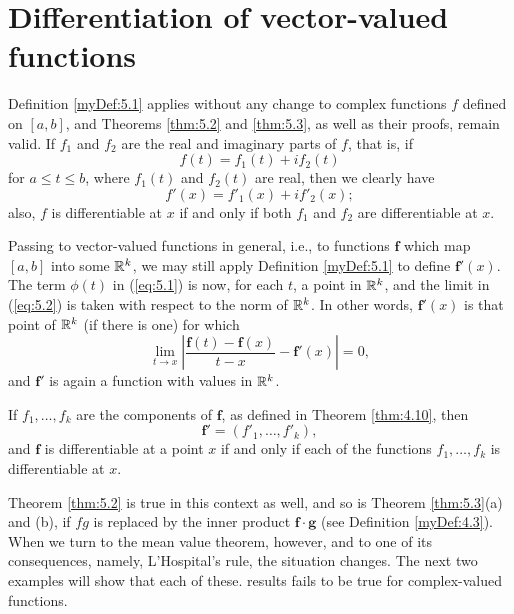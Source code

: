\section{Differentiation of vector-valued functions}

\begin{myRemark}
    Definition \ref{myDef:5.1} applies without any change to complex functions $f$ defined on $[a, b]$, 
    and Theorems \ref{thm:5.2} and \ref{thm:5.3}, as well as their proofs, remain valid. 
    If  $f_1$ and $f_2$ are the real and imaginary parts of $f$, 
    that is, if
    \begin{equation*}
        f(t) = f_1(t) + i f_2(t)
    \end{equation*}
    for $a \leq t \leq b$, where $f_1(t)$ and $f_2(t)$ are real, 
    then we clearly have
    \begin{equation}
        \label{eq:5.29}
        f'(x) = f'_1(x) + i f'_2(x);
    \end{equation}
    also, $f$ is differentiable at $x$ if and only if both $f_1$ and $f_2$ are differentiable at $x$.
\end{myRemark}

Passing to vector-valued functions in general, 
i.e., to functions $\mathbf{f}$ which map $[a, b]$ into some ${\protect\mathbb R}^k$, 
we may still apply Definition \ref{myDef:5.1} to define $\mathbf{f}'(x)$. 
The term $\phi(t)$ in (\ref{eq:5.1}) is now, for each $t$, a point in ${\protect\mathbb R}^k$, 
and the limit in (\ref{eq:5.2}) is taken with respect to the norm of ${\protect\mathbb R}^k$. 
In other words, $\mathbf{f}'(x)$ is that point of ${\protect\mathbb R}^k$ 
(if there is one) for which
\begin{equation}
    \label{eq:5.30}
    \lim_{t \to x} \left| \frac{\mathbf{f}(t) - \mathbf{f}(x)}{t-x} - \mathbf{f}'(x)\right|  = 0,
\end{equation}
and $\mathbf{f}'$ is again a function with values in ${\protect\mathbb R}^k$.

If $f_1, \dots, f_k$ are the components of $\mathbf{f}$, 
as defined in Theorem \ref{thm:4.10}, then
\begin{equation}
    \label{eq:5.31}
    \mathbf{f}' = (f'_1,\dots,f'_k),
\end{equation}
and $\mathbf{f}$ is differentiable at a point $x$ 
if and only if each of the functions $f_1, \dots, f_k$
is differentiable at $x$.

Theorem \ref{thm:5.2} is true in this context as well, 
and so is Theorem \ref{thm:5.3}(a) and (b), 
if $fg$ is replaced by the inner product $\mathbf{f} \cdot \mathbf{g}$ (see Definition \ref{myDef:4.3}).
When we turn to the mean value theorem, however, and to one of its
consequences, namely, L'Hospital's rule, the situation changes. 
The next two examples will show that each of these. results fails to be true for complex-valued functions.

